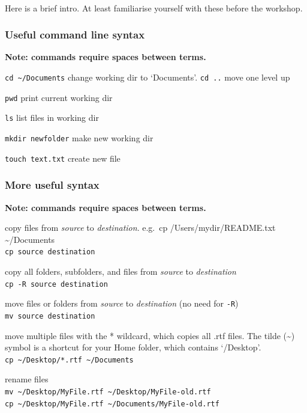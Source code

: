 \documentclass[10,portrait]{article}
\begin{document}
~

Here is a brief intro. At least familiarise yourself with these before
the workshop.

\subsubsection{Useful command line
syntax}\label{useful-command-line-syntax}

\textbf{Note: commands require spaces between terms.}

\texttt{cd\ \textasciitilde{}/Documents} change working dir to
`Documents'. \texttt{cd\ ..} move one level up

\texttt{pwd} print current working dir

\texttt{ls} list files in working dir

\texttt{mkdir\ newfolder} make new working dir

\texttt{touch\ text.txt} create new file

\subsubsection{More useful syntax}\label{more-useful-syntax}

\textbf{Note: commands require spaces between terms.}

copy files from \emph{source} to \emph{destination}. e.g.~cp
/Users/mydir/README.txt \textasciitilde{}/Documents\\
\texttt{cp\ source\ destination}

copy all folders, subfolders, and files from \emph{source} to
\emph{destination}\\
\texttt{cp\ -R\ source\ destination}

move files or folders from \emph{source} to \emph{destination} (no need
for \texttt{-R})\\
\texttt{mv\ source\ destination}

move multiple files with the * wildcard, which copies all .rtf files.
The tilde (\textasciitilde{}) symbol is a shortcut for your Home folder,
which contains `/Desktop'.\\
\texttt{cp\ \textasciitilde{}/Desktop/*.rtf\ \textasciitilde{}/Documents}

rename files\\
\texttt{mv\ \textasciitilde{}/Desktop/MyFile.rtf\ \textasciitilde{}/Desktop/MyFile-old.rtf}\\
\texttt{cp\ \textasciitilde{}/Desktop/MyFile.rtf\ \textasciitilde{}/Documents/MyFile-old.rtf}
\end{document}
